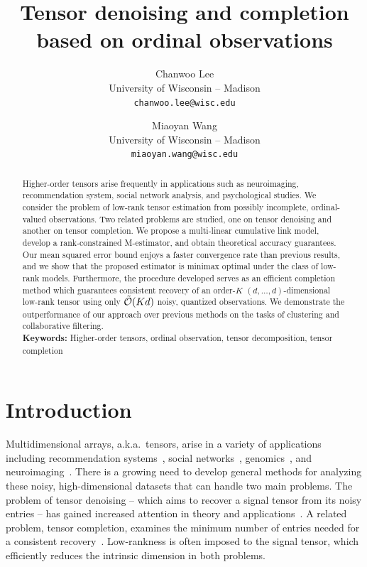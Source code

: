 \documentclass[11pt]{article}
\title{Tensor denoising and completion based on ordinal observations}
\date{}
\author{%
Chanwoo Lee \\
University of Wisconsin -- Madison\\
\texttt{chanwoo.lee@wisc.edu} \\
\and
Miaoyan Wang \\
University of Wisconsin -- Madison\\
\texttt{miaoyan.wang@wisc.edu} \\
}
\theoremstyle{plain}
\theoremstyle{definition}
\begin{document}
\maketitle
\begin{abstract}
Higher-order tensors arise frequently in applications such as neuroimaging, recommendation system, social network analysis, and psychological studies. We consider the problem of low-rank tensor estimation from possibly incomplete, ordinal-valued observations. Two related problems are studied, one on tensor denoising and another on tensor completion. We propose a multi-linear cumulative link model, develop a rank-constrained M-estimator, and obtain theoretical accuracy guarantees. Our mean squared error bound enjoys a faster convergence rate than previous results, and we show that the proposed estimator is minimax optimal under the class of low-rank models. Furthermore, the procedure developed serves as an efficient completion method which guarantees consistent recovery of an order-$K$ $(d,\ldots,d)$-dimensional low-rank tensor using only $\tilde {\mathcal{O}}(Kd)$ noisy, quantized observations. We demonstrate the outperformance of our approach over previous methods on the tasks of clustering and collaborative filtering.
\\[0.5cm]
\textbf{Keywords:} Higher-order tensors, ordinal observation, tensor decomposition, tensor completion
\end{abstract}

\section{Introduction}
Multidimensional arrays, a.k.a.\ tensors, arise in a variety of applications including recommendation systems~\citep{baltrunas2011incarmusic}, social networks~\citep{nickel2011three}, genomics~\citep{hore2016tensor}, and neuroimaging~\citep{zhou2013tensor}. There is a growing need to develop general methods for analyzing these noisy, high-dimensional datasets that can handle two main problems. The problem of tensor denoising -- which aims to recover a signal tensor from its noisy entries -- has gained increased attention in theory and applications~\citep{xia2019sup,zeng2019multiway}. A related problem, tensor completion, examines the minimum number of entries needed for a consistent recovery~\citep{ghadermarzy2018learning,ghadermarzy2019near}. Low-rankness is often imposed to the signal tensor, which efficiently reduces the intrinsic dimension in both problems.
\end{document}
